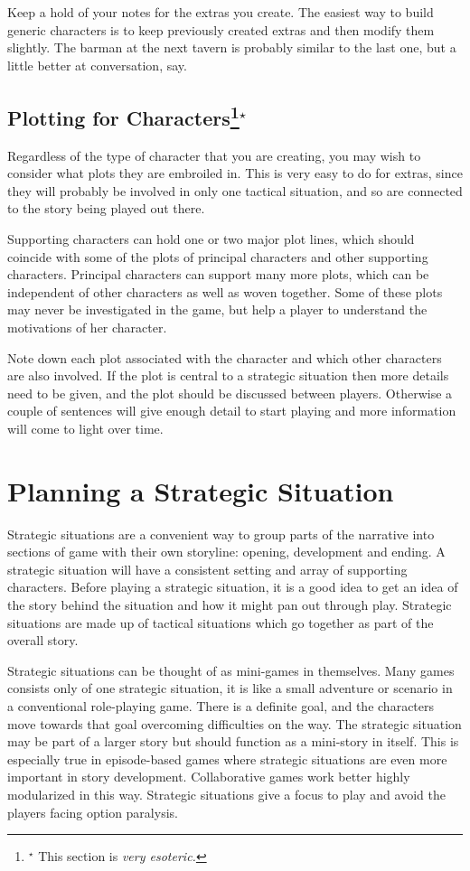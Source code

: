 \documentclass[twoside]{book}
\begin{document}
Keep a hold of your notes for the extras you create. The easiest way
to build generic characters is to keep previously created extras and
then modify them slightly. The barman at the next tavern is probably
similar to the last one, but a little better at conversation, say.

\subsection{Plotting for Characters\protect\footnote{$^\star$ This section is {\it very esoteric.}}$^\star$} %

Regardless of the type of character that you are creating, you may
wish to consider what plots they are embroiled in. This is very easy
to do for extras, since they will probably be involved in only one
tactical situation, and so are connected to the story being played out
there.

Supporting characters can hold one or two major plot lines, which
should coincide with some of the plots of principal characters and
other supporting characters. Principal characters can support many
more plots, which can be independent of other characters as well as
woven together. Some of these plots may never be investigated in the
game, but help a player to understand the motivations of her
character.

Note down each plot associated with the character and which other
characters are also involved. If the plot is central to a strategic
situation then more details need to be given, and the plot should be
discussed between players. Otherwise a couple of sentences will give
enough detail to start playing and more information will come to light
over time.

\section{Planning a Strategic Situation}

Strategic situations are a convenient way to group parts of the
narrative into sections of game with their own storyline: opening,
development and ending. A strategic situation will have a consistent
setting and array of supporting characters. Before playing a strategic
situation, it is a good idea to get an idea of the story behind the
situation and how it might pan out through play. Strategic situations
are made up of tactical situations which go together as part of the
overall story.

Strategic situations can be thought of as mini-games in
themselves. Many games consists only of one strategic situation, it is
like a small adventure or scenario in a conventional role-playing
game. There is a definite goal, and the characters move towards that
goal overcoming difficulties on the way. The strategic situation may
be part of a larger story but should function as a mini-story in
itself. This is especially true in episode-based games where strategic
situations are even more important in story development. Collaborative
games work better highly modularized in this way. Strategic situations
give a focus to play and avoid the players facing option paralysis.
\end{document}
